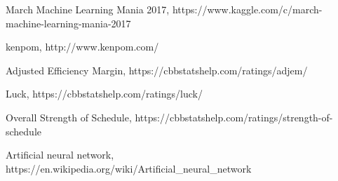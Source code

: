 \documentclass[
10pt, %
a4paper, %
oneside, %
headinclude,footinclude, %
BCOR5mm, %
]{scrartcl}
\begin{document}
\begin{thebibliography}{6}
March Machine Learning Mania 2017, https://www.kaggle.com/c/march-machine-learning-mania-2017

kenpom, http://www.kenpom.com/

Adjusted Efficiency Margin, https://cbbstatshelp.com/ratings/adjem/
 
Luck, https://cbbstatshelp.com/ratings/luck/
 
Overall Strength of Schedule, https://cbbstatshelp.com/ratings/strength-of-schedule
 
Artificial neural network, https://en.wikipedia.org/wiki/Artificial\_neural\_network
\end{thebibliography}

\end{document}
